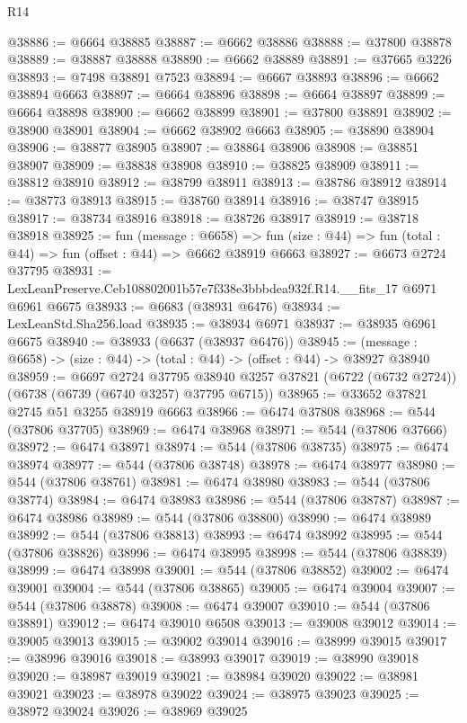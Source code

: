 \begin{lexlean}{R14}
\begin{coremodule}
@38886 := @6664 @38885
@38887 := @6662 @38886
@38888 := @37800 @38878
@38889 := @38887 @38888
@38890 := @6662 @38889
@38891 := @37665 @3226
@38893 := @7498 @38891 @7523
@38894 := @6667 @38893
@38896 := @6662 @38894 @6663
@38897 := @6664 @38896
@38898 := @6664 @38897
@38899 := @6664 @38898
@38900 := @6662 @38899
@38901 := @37800 @38891
@38902 := @38900 @38901
@38904 := @6662 @38902 @6663
@38905 := @38890 @38904
@38906 := @38877 @38905
@38907 := @38864 @38906
@38908 := @38851 @38907
@38909 := @38838 @38908
@38910 := @38825 @38909
@38911 := @38812 @38910
@38912 := @38799 @38911
@38913 := @38786 @38912
@38914 := @38773 @38913
@38915 := @38760 @38914
@38916 := @38747 @38915
@38917 := @38734 @38916
@38918 := @38726 @38917
@38919 := @38718 @38918
@38925 := fun (message : @6658) =>
  fun (size : @44) => fun (total : @44) => fun (offset : @44) => @6662 @38919 @6663
@38927 := @6673 @2724 @37795
@38931 := LexLeanPreserve.Ceb108802001b57e7f338e3bbbdea932f.R14.__fits_17 @6971 @6961 @6675
@38933 := @6683 (@38931 @6476)
@38934 := LexLeanStd.Sha256.load
@38935 := @38934 @6971
@38937 := @38935 @6961 @6675
@38940 := @38933 (@6637 (@38937 @6476))
@38945 := (message : @6658) -> (size : @44) -> (total : @44) -> (offset : @44) -> @38927 @38940
@38959 := @6697
    @2724
    @37795
    @38940
    @3257
    @37821
    (@6722 (@6732 @2724))
    (@6738 (@6739 (@6740 @3257) @37795 @6715))
@38965 := @33652 @37821 @2745 @51 @3255 @38919 @6663
@38966 := @6474 @37808
@38968 := @544 (@37806 @37705)
@38969 := @6474 @38968
@38971 := @544 (@37806 @37666)
@38972 := @6474 @38971
@38974 := @544 (@37806 @38735)
@38975 := @6474 @38974
@38977 := @544 (@37806 @38748)
@38978 := @6474 @38977
@38980 := @544 (@37806 @38761)
@38981 := @6474 @38980
@38983 := @544 (@37806 @38774)
@38984 := @6474 @38983
@38986 := @544 (@37806 @38787)
@38987 := @6474 @38986
@38989 := @544 (@37806 @38800)
@38990 := @6474 @38989
@38992 := @544 (@37806 @38813)
@38993 := @6474 @38992
@38995 := @544 (@37806 @38826)
@38996 := @6474 @38995
@38998 := @544 (@37806 @38839)
@38999 := @6474 @38998
@39001 := @544 (@37806 @38852)
@39002 := @6474 @39001
@39004 := @544 (@37806 @38865)
@39005 := @6474 @39004
@39007 := @544 (@37806 @38878)
@39008 := @6474 @39007
@39010 := @544 (@37806 @38891)
@39012 := @6474 @39010 @6508
@39013 := @39008 @39012
@39014 := @39005 @39013
@39015 := @39002 @39014
@39016 := @38999 @39015
@39017 := @38996 @39016
@39018 := @38993 @39017
@39019 := @38990 @39018
@39020 := @38987 @39019
@39021 := @38984 @39020
@39022 := @38981 @39021
@39023 := @38978 @39022
@39024 := @38975 @39023
@39025 := @38972 @39024
@39026 := @38969 @39025

\end{coremodule}
\end{lexlean}
